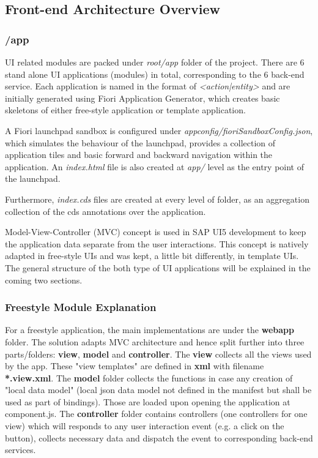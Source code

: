 \subsection{Front-end Architecture Overview}

\subsubsection{/app}

UI related modules are packed under \textit{root/app} folder of the project. There are 6 stand alone UI applications (modules) in total, corresponding to the 6 back-end service. Each application is named in the format of \textit{<action|entity>} and are initially generated using Fiori Application Generator, which creates basic skeletons of either free-style application or template application. 

A Fiori launchpad sandbox is configured under \textit{appconfig/fioriSandboxConfig.json}, which simulates the behaviour of the launchpad, provides a collection of application tiles and basic forward and backward navigation within the application. An \textit{index.html} file is also created at \textit{app/} level as the entry point of the launchpad.

Furthermore, \textit{index.cds} files are created at every level of folder, as an aggregation collection of the cds annotations over the application.

Model-View-Controller (MVC) concept is used in SAP UI5 development to keep the application data separate from the user interactions. This concept is natively adapted in free-style UIs and was kept, a little bit differently, in template UIs. The general structure of the both type of UI applications will be explained in the coming two sections. 

\subsubsection{Freestyle Module Explanation}
For a freestyle application, the main implementations are under the \textbf{webapp} folder. The solution adapts MVC architecture and hence split further into three parts/folders: \textbf{view}, \textbf{model} and \textbf{controller}. The \textbf{view} collects all the views used by the app. These "view templates" are defined in \textbf{xml} with filename \textbf{*.view.xml}. The \textbf{model} folder collects the functions in case any creation of "local data model" (local json data model not defined in the manifest but shall be used as part of bindings). Those are loaded upon opening the application at component.js. The \textbf{controller} folder contains controllers (one controllers for one view) which will responds to any user interaction event (e.g. a click on the button), collects necessary data and dispatch the event to corresponding back-end services.

